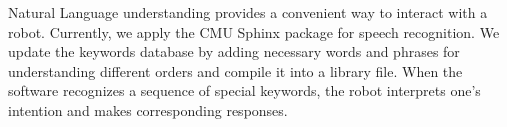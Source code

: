 Natural Language understanding provides a convenient way to interact with a robot. Currently, we apply the CMU Sphinx package\cite{lamere2003cmu} for speech recognition. We update the keywords database by adding necessary words and phrases for understanding different orders and compile it into a library file. When the software recognizes a sequence of special keywords, the robot interprets one's intention and makes corresponding responses.
